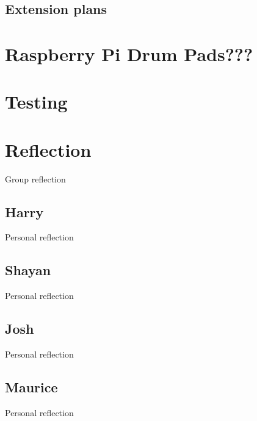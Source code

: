 \documentclass[11pt]{article}
\begin{document}
\subsection{Extension plans}

\section{Raspberry Pi Drum Pads???}

\section{Testing}

\section{Reflection}
Group reflection

\subsection{Harry}
Personal reflection

\subsection{Shayan}
Personal reflection

\subsection{Josh}
Personal reflection

\subsection{Maurice}
Personal reflection
\end{document}
